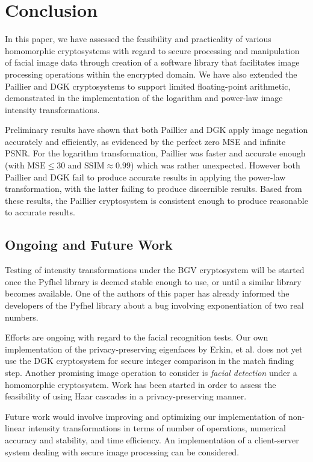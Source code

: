 \section{Conclusion}
In this paper, we have assessed the feasibility and practicality of various homomorphic cryptosystems with regard to secure processing and manipulation of facial image data through creation of a software library that facilitates image processing operations within the encrypted domain. We have also extended the Paillier and DGK cryptosystems to support limited floating-point arithmetic, demonstrated in the implementation of the logarithm and power-law image intensity transformations. 

Preliminary results have shown that both Paillier and DGK apply image negation accurately and efficiently, as evidenced by the perfect zero MSE and infinite PSNR. For the logarithm transformation, Paillier was faster and accurate enough (with $\text{MSE} \le 30$ and $\text{SSIM} \approx 0.99$) which was rather unexpected. However both Paillier and DGK fail to produce accurate results in applying the power-law transformation, with the latter failing to produce discernible results. Based from these results, the Paillier cryptosystem is consistent enough to produce reasonable to accurate results.

\subsection{Ongoing and Future Work}
Testing of intensity transformations under the BGV cryptosystem will be started once the Pyfhel library is deemed stable enough to use, or until a similar library becomes available.
One of the authors of this paper has already informed the developers of the Pyfhel library about a bug involving exponentiation of two real numbers.

Efforts are ongoing with regard to the facial recognition tests. Our own implementation of the privacy-preserving eigenfaces by Erkin, et al. does not yet use the DGK cryptosystem for secure integer comparison in the match finding step.
Another promising image operation to consider is \textit{facial detection} under a homomorphic cryptosystem. Work has been started in order to assess the feasibility of using Haar cascades in a privacy-preserving manner.

Future work would involve improving and optimizing our implementation of non-linear intensity transformations in terms of number of operations, numerical accuracy and stability, and time efficiency. An implementation of a client-server system dealing with secure image processing can be considered.
